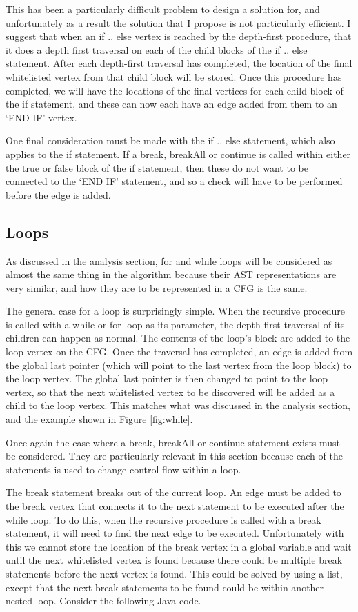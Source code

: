 This has been a particularly difficult problem to design a solution for, and unfortunately as a result the solution that I propose is not particularly efficient. I suggest that when an if .. else vertex is reached by the depth-first procedure, that it does a depth first traversal on each of the child blocks of the if .. else statement. After each depth-first traversal has completed, the location of the final whitelisted vertex from that child block will be stored. Once this procedure has completed, we will have the locations of the final vertices for each child block of the if statement, and these can now each have an edge added from them to an `END IF' vertex.

One final consideration must be made with the if .. else statement, which also applies to the if statement. If a break, breakAll or continue is called within either the true or false block of the if statement, then these do not want to be connected to the `END IF' statement, and so a check will have to be performed before the edge is added. 

\subsection{Loops}

As discussed in the analysis section, for and while loops will be considered as almost the same thing in the algorithm because their AST representations are very similar, and how they are to be represented in a CFG is the same.

The general case for a loop is surprisingly simple. When the recursive procedure is called with a while or for loop as its parameter, the depth-first traversal of its children can happen as normal. The contents of the loop's block are added to the loop vertex on the CFG. Once the traversal has completed, an edge is added from the global last pointer (which will point to the last vertex from the loop block) to the loop vertex. The global last pointer is then changed to point to the loop vertex, so that the next whitelisted vertex to be discovered will be added as a child to the loop vertex. This matches what was discussed in the analysis section, and the example shown in Figure \ref{fig:while}.

Once again the case where a break, breakAll or continue statement exists must be considered. They are particularly relevant in this section because each of the statements is used to change control flow within a loop. 

The break statement breaks out of the current loop. An edge must be added to the break vertex that connects it to the next statement to be executed after the while loop. To do this, when the recursive procedure is called with a break statement, it will need to find the next edge to be executed. Unfortunately with this we cannot store the location of the break vertex in a global variable and wait until the next whitelisted vertex is found because there could be multiple break statements before the next vertex is found. This could be solved by using a list, except that the next break statements to be found could be within another nested loop. Consider the following Java code.

